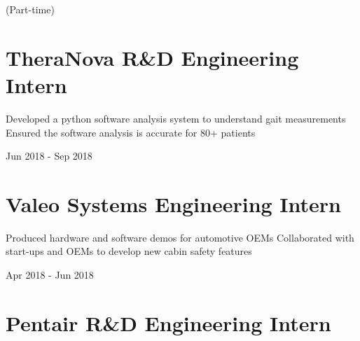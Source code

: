 \documentclass[letterpaper,10pt,oneside]{article}
\begin{document}
\begin{body}
\begin{detail}
\begin{subtitle}
\vspace{-2.0ex}
{{(Part-time)}} 
\end{subtitle}


\section
{\textbf{TheraNova}
\newline
R\&D Engineering Intern
}

\BulletItem
\vspace{-2.5ex}
\begin{detail}

\BulletItem
 Developed a python software analysis system to understand gait measurements
\BulletItem
 Ensured the software analysis is accurate for 80+ patients
\end{detail}

\begin{subtitle}
\vspace{-7.8ex}
{{Jun 2018 - Sep 2018}}
\end{subtitle}
\vspace{0ex}

\section
{\textbf{Valeo}
\newline
Systems Engineering Intern}

\BulletItem
\vspace{-2.5ex}
\begin{detail}
\BulletItem
 Produced hardware and software demos for automotive OEMs
\BulletItem
 Collaborated with start-ups and OEMs to develop new cabin safety features
\end{detail}

\begin{subtitle}
\vspace{-7.8ex}
{{Apr 2018 - Jun 2018}}
\end{subtitle}
\vspace{0ex}

\section
{\textbf{Pentair}
\newline
R\&D Engineering Intern}


\end{detail}
\end{body}
\end{document}
